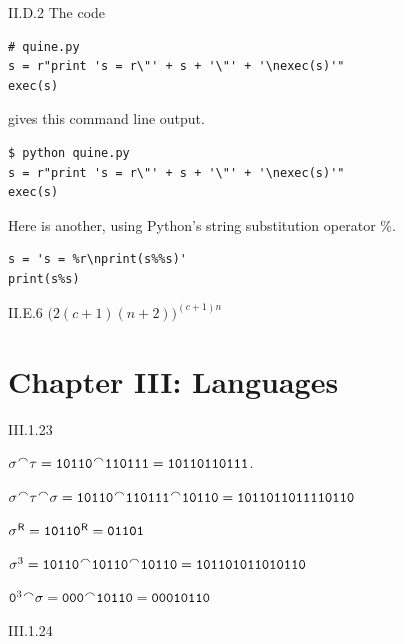%
\begin{ans}{II.D.2}
The code
\begin{lstlisting}
# quine.py
s = r"print 's = r\"' + s + '\"' + '\nexec(s)'"
exec(s)
\end{lstlisting}
gives this command line output.
\begin{lstlisting}
$ python quine.py
s = r"print 's = r\"' + s + '\"' + '\nexec(s)'"
exec(s)
\end{lstlisting} %

Here is another, using Python's string substitution operator $\%$.
\begin{lstlisting}
s = 's = %r\nprint(s%%s)'
print(s%s)
\end{lstlisting}
\end{ans}
%
%
%
%
%
\begin{ans}{II.E.6}
$\bigl( 2(c+1)(n+2) \bigr)^{(c+1)n}$
\end{ans}
%
%
\protect \chapter {Chapter III: Languages}
%
\begin{ans}{III.1.23}
\begin{exparts}
\item $\sigma\concat \tau=\str{10110}\concat\str{110111}=\str{10110110111}$.
\item $\sigma\concat\tau\concat\sigma=
   \str{10110}\concat\str{110111}\concat\str{10110}=\str{1011011011110110}$
\item ${{\sigma}^{{\mskip 1mu}\textsf{R}}}={{\texttt{10110}}^{{\mskip 1mu}\textsf{R}}}=\texttt{01101}$
\item $\sigma^3=\str{10110}\concat\str{10110}\concat\str{10110}
               =\str{101101011010110}$
\item $\str{0}^3\concat\sigma=\str{000}\concat\str{10110}=\str{00010110}$
\end{exparts}
\end{ans}
%
\begin{ans}{III.1.24}
\begin{exparts}
\item {}
\item {}
\item {}
\item {}
\end{exparts}
\end{ans}
